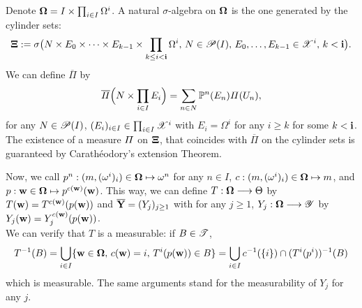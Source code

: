 Denote $\mathbf{\Omega}= I \times\prod_{i\in I}\Omega^i$. A natural $\sigma$-algebra on $\mathbf{\Omega}$ is the one generated by the cylinder sets:
\begin{equation}
    \mathbf{\Xi} := \sigma\big(N\times E_0\times\dots\times E_{k-1}\times\prod_{k\leq i<\mathbf{i}}\Omega^i,\,N\in\mathscr{P}(I),\, E_0,\dots,E_{k-1}\in\mathscr{X}^i,\,k<\mathbf{i} \big).
\end{equation}
We can define $\overline\varPi$ by
    \begin{equation}
        \overline\varPi\Big(N\times\prod_{i\in I}E_i\Big) = \sum_{n\in N}\mathbb{P}^n(E_n)\varPi(U_n),
    \end{equation}
for any $N\in\mathscr{P}(I)$, $(E_i)_{i \in I} \in\prod_{i\in I}\mathscr{X}^i$ with $E_i=\Omega^i$ for any $i\geq k$ for some $k<\mathbf{i}$. 
The existence of a measure $\mathbf{\varPi}$ on $\mathbf{\Xi}$, that coincides with $\overline\varPi$ on the cylinder sets is guaranteed by  Carathéodory's extension Theorem. %




Now, we call $p^n:(m,(\omega^i)_i)\in\mathbf{\Omega}\mapsto \omega^n$ for any $n\in I$, $c:(m,(\omega^i)_i)\in\mathbf{\Omega}\mapsto m$, and $p:\mathbf{w}\in\mathbf{\Omega}\mapsto p^{c(\mathbf{w})}(\mathbf{w})$.
This way, we can define $T:\mathbf{\Omega}\longrightarrow\Theta$ by $T(\mathbf{w})=T^{c(\mathbf{w})}(p(\mathbf{w}))$ and $\overline{\mathbf{Y}}=(Y_j)_{j\geq1}$ with for any $j\geq1$, $Y_j:\mathbf{\Omega}\longrightarrow\mathscr{Y}$ by $Y_j(\mathbf{w})=Y_j^{c(\mathbf{w})}(p(\mathbf{w}))$.\\
We can verify that $T$ is a measurable: if $B\in\mathscr{T}$,  
    \begin{equation}
        T^{-1}(B) = \bigcup_{i\in I}\{\mathbf{w}\in\mathbf{\Omega},\, c(\mathbf{w})=i,\,T^i(p(\mathbf{w}))\in B  \} = \bigcup_{i\in I}c^{-1}(\{i\})\cap (T^i(p^i))^{-1}(B)
    \end{equation}
which is measurable. 
The same arguments stand for the measurability of $Y_j$ for any $j$.




%



